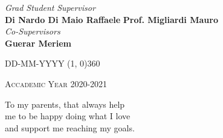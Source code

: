 \documentclass[a4paper, 12pt, twoside, openright]{book}
\newenvironment{abstract}{\cleardoublepage \null \vfill \begin{center}\bfseries\abstractname \end{center}}{\vfill\null}
\begin{document}
\begin{titlepage}
\vfill
\begin{normalsize}
\begin{flushleft}
  \hspace{55pt} \textit{Grad Student} \hspace{120pt} \textit{Supervisor}\\
  \vspace{5pt}
  \hspace{25pt} \large{\textbf{\footnotesize{Di Nardo Di Maio Raffaele}}} \hspace{55pt} \large{\textbf{\footnotesize{Prof. Migliardi Mauro}}}\\
  \vspace{50pt}
  \hspace{240pt} \normalsize{\textit{Co-Supervisors}}\\
  \vspace{5pt}
  \hspace{242pt} \large{\textbf{\footnotesize{Guerar Meriem}}}
\end{flushleft}
\end{normalsize}

\vfill
\begin{center}
\textsc{DD-MM-YYYY}
\hspace{-0.2cm}
\line(1, 0){360}

\textsc{Accademic Year 2020-2021}
\end{center}
\end{titlepage}


\cleardoublepage %
\thispagestyle{empty} %

\null
\vspace{2cm}
\begin{flushright}
  To my parents, that always help\\
 me to be happy doing what I love\\
and support me reaching my goals.
\end{flushright}
\vfill
\begin{quote}
  \textit{}
\end{quote}
\vfill
\null


%
\begingroup %
  \makeatletter
  \let\ps@plain\ps@empty
  \makeatother
  \tableofcontents  
  \clearpage
\endgroup

\mainmatter

\end{document}
